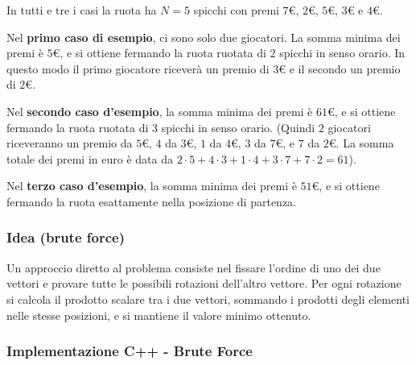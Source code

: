 In tutti e tre i casi la ruota ha \(N=5\) spicchi con premi $7€$, $2€$, $5€$, $3€$ e $4€$.
\medskip

Nel \textbf{primo caso di esempio}, ci sono solo due giocatori. La somma minima dei premi è $5€$, e si ottiene fermando la ruota ruotata di $2$ spicchi in senso orario. In questo modo il primo giocatore riceverà un premio di $3€$ e il secondo un premio di $2€$.
\medskip

Nel \textbf{secondo caso d'esempio}, la somma minima dei premi è $61€$, e si ottiene fermando la ruota ruotata di $3$ spicchi in senso orario. (Quindi $2$ giocatori riceveranno un premio da $5€$, $4$ da $3€$, $1$ da $4€$, $3$ da $7€$, e $7$ da $2€$. La somma totale dei premi in euro è data da $2\cdot5+4\cdot3+1\cdot4+3\cdot7+7\cdot2 = 61$).

\medskip
Nel \textbf{terzo caso d'esempio}, la somma minima dei premi è $51€$, e si ottiene fermando la ruota esattamente nella posizione di partenza.


\subsubsection*{Idea (brute force)}

Un approccio diretto al problema consiste nel fissare l’ordine di uno dei due vettori e provare tutte le possibili rotazioni dell’altro vettore.
Per ogni rotazione si calcola il prodotto scalare tra i due vettori, sommando i prodotti degli elementi nelle stesse posizioni, e si mantiene il valore minimo ottenuto.

\subsubsection*{Implementazione C++ - Brute Force}

